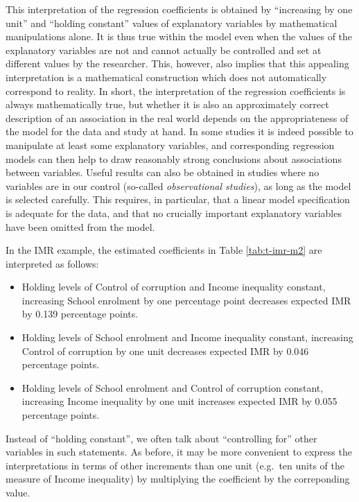 \documentclass[11pt,a4paper,openany]{book}
\begin{document}
This interpretation of the regression coefficients is obtained by
``increasing by one unit'' and ``holding constant'' values of
explanatory variables by mathematical manipulations alone. It is thus
true within the model even when the values of the explanatory variables
are not and cannot actually be controlled and set at different values by
the researcher. This, however, also implies that this appealing
interpretation is a mathematical construction which does not
automatically correspond to reality. In short, the interpretation of the
regression coefficients is always mathematically true, but whether it is
also an approximately correct description of an association in the real
world depends on the appropriateness of the model for the data and study
at hand. In some studies it is indeed possible to manipulate at least
some explanatory variables, and corresponding regression models can then
help to draw reasonably strong conclusions about associations between
variables. Useful results can also be obtained in studies where no
variables are in our control (so-called \emph{observational studies}),
as long as the model is selected carefully. This requires, in
particular, that a linear model specification is adequate for the data,
and that no crucially important explanatory variables have been omitted
from the model.

In the IMR example, the estimated coefficients in Table
\ref{tab:t-imr-m2} are interpreted as follows:

\begin{itemize}
\item
  Holding levels of Control of corruption and Income inequality
  constant, increasing School enrolment by one percentage point
  decreases expected IMR by 0.139 percentage points.
\item
  Holding levels of School enrolment and Income inequality constant,
  increasing Control of corruption by one unit decreases expected IMR by
  0.046 percentage points.
\item
  Holding levels of School enrolment and Control of corruption constant,
  increasing Income inequality by one unit increases expected IMR by
  0.055 percentage points.
\end{itemize}

Instead of ``holding constant'', we often talk about ``controlling for''
other variables in such statements. As before, it may be more convenient
to express the interpretations in terms of other increments than one
unit (e.g.~ten units of the measure of Income inequality) by multiplying
the coefficient by the correponding value.
\end{document}
